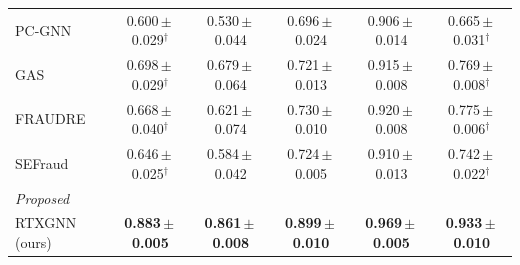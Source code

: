 \begin{tabular}{lccccc}
PC-GNN & 0.600\,$\pm$\,0.029$^{\dagger}$ & 0.530\,$\pm$\,0.044 & 0.696\,$\pm$\,0.024 & 0.906\,$\pm$\,0.014 & 0.665\,$\pm$\,0.031$^{\dagger}$\\
GAS & 0.698\,$\pm$\,0.029$^{\dagger}$ & 0.679\,$\pm$\,0.064 & 0.721\,$\pm$\,0.013 & 0.915\,$\pm$\,0.008 & 0.769\,$\pm$\,0.008$^{\dagger}$\\
FRAUDRE & 0.668\,$\pm$\,0.040$^{\dagger}$ & 0.621\,$\pm$\,0.074 & 0.730\,$\pm$\,0.010 & 0.920\,$\pm$\,0.008 & 0.775\,$\pm$\,0.006$^{\dagger}$\\
SEFraud & 0.646\,$\pm$\,0.025$^{\dagger}$ & 0.584\,$\pm$\,0.042 & 0.724\,$\pm$\,0.005 & 0.910\,$\pm$\,0.013 & 0.742\,$\pm$\,0.022$^{\dagger}$\\
\multicolumn{6}{l}{\textit{Proposed}}\\
RTXGNN (ours) & \textbf{0.883\,$\pm$\,0.005} & \textbf{0.861\,$\pm$\,0.008} & \textbf{0.899\,$\pm$\,0.010} & \textbf{0.969\,$\pm$\,0.005} & \textbf{0.933\,$\pm$\,0.010}\\
\bottomrule
\end{tabular}
